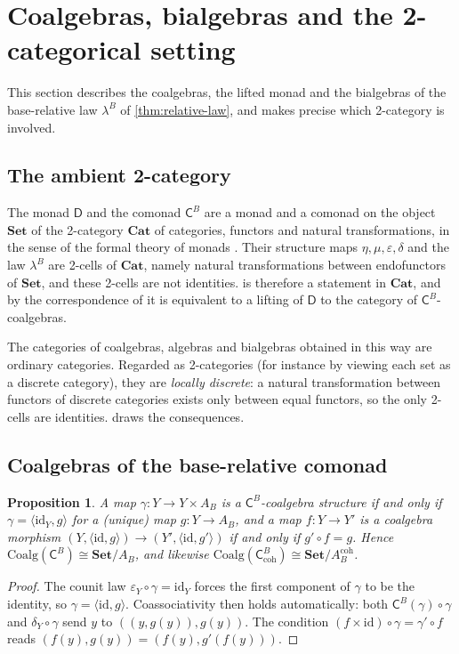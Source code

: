 \documentclass[11pt]{article}
\newtheorem{proposition}[theorem]{Proposition}
\theoremstyle{definition}
\theoremstyle{remark}
\newcommand{\D}{\mathsf{D}}
\newcommand{\Set}{\mathbf{Set}}
\newcommand{\C}{\mathsf{C}}
\newcommand{\id}{\mathrm{id}}
\begin{document}
\section{Coalgebras, bialgebras and the 2-categorical setting}\label{sec:coalg}

This section describes the coalgebras, the lifted monad and the bialgebras of the base-relative law
$\lambda^B$ of \cref{thm:relative-law}, and makes precise which 2-category is involved.

\subsection{The ambient 2-category}\label{sec:ambient}

The monad $\D$ and the comonad $\C^B$ are a monad and a comonad on the object $\Set$ of the
2-category $\mathbf{Cat}$ of categories, functors and natural transformations, in the sense of the
formal theory of monads \cite{Street1972}. Their structure maps $\eta,\mu,\varepsilon,\delta$ and the
law $\lambda^B$ are 2-cells of $\mathbf{Cat}$, namely natural transformations between endofunctors of
$\Set$, and these 2-cells are not identities.  is therefore a statement in
$\mathbf{Cat}$, and by the correspondence of \cite{PowerWatanabe2002} it is equivalent to a lifting of
$\D$ to the category of $\C^B$-coalgebras.

The categories of coalgebras, algebras and bialgebras obtained in this way are ordinary categories.
Regarded as 2-categories (for instance by viewing each set as a discrete category), they are
\emph{locally discrete}: a natural transformation between functors of discrete categories exists only
between equal functors, so the only 2-cells are identities.  draws the consequences.

\subsection{Coalgebras of the base-relative comonad}

\begin{proposition}\label{prop:coalg}
A map $\gamma\colon Y\to Y\times A_B$ is a $\C^B$-coalgebra structure if and only if
$\gamma=\langle\id_Y,g\rangle$ for a (unique) map $g\colon Y\to A_B$, and a map $f\colon Y\to Y'$ is a
coalgebra morphism $(Y,\langle\id,g\rangle)\to(Y',\langle\id,g'\rangle)$ if and only if $g'\circ f=g$.
Hence $\mathrm{Coalg}(\C^B)\cong\Set/A_B$, and likewise $\mathrm{Coalg}(\C^B_{\mathrm{coh}})\cong
\Set/A^{\mathrm{coh}}_B$.
\end{proposition}
\begin{proof}
The counit law $\varepsilon_Y\circ\gamma=\id_Y$ forces the first component of $\gamma$ to be the
identity, so $\gamma=\langle\id,g\rangle$. Coassociativity then holds automatically: both
$\C^B(\gamma)\circ\gamma$ and $\delta_Y\circ\gamma$ send $y$ to $((y,g(y)),g(y))$. The condition
$(f\times\id)\circ\gamma=\gamma'\circ f$ reads $(f(y),g(y))=(f(y),g'(f(y)))$.
\end{proof}
\end{document}

